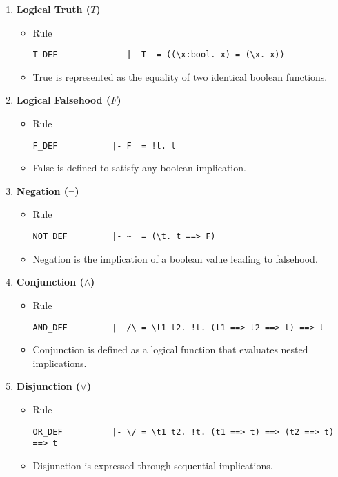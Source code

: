 \begin{enumerate}
    \item \textbf{Logical Truth ($T$)}
    \begin{itemize}
    \item Rule
\begin{verbatim}
T_DEF              |- T  = ((\x:bool. x) = (\x. x))
\end{verbatim}
        \item True is represented as the equality of two identical boolean functions.
    \end{itemize}

    \item \textbf{Logical Falsehood ($F$)}
    \begin{itemize}
        \item Rule
\begin{verbatim}
F_DEF           |- F  = !t. t
\end{verbatim}
        \item False is defined to satisfy any boolean implication.
    \end{itemize}

    \item \textbf{Negation ($\neg$)}
    \begin{itemize}
        \item Rule
\begin{verbatim}
NOT_DEF         |- ~  = (\t. t ==> F)
\end{verbatim}
        \item Negation is the implication of a boolean value leading to falsehood.
    \end{itemize}

    \item \textbf{Conjunction ($\wedge$)}
    \begin{itemize}
        \item Rule
\begin{verbatim}
AND_DEF         |- /\ = \t1 t2. !t. (t1 ==> t2 ==> t) ==> t
\end{verbatim}
        \item Conjunction is defined as a logical function that evaluates nested implications.
    \end{itemize}

    \item \textbf{Disjunction ($\vee$)}
    \begin{itemize}
        \item Rule
\begin{verbatim}
OR_DEF          |- \/ = \t1 t2. !t. (t1 ==> t) ==> (t2 ==> t) ==> t
\end{verbatim}
        \item Disjunction is expressed through sequential implications.
    \end{itemize}


\end{enumerate}
